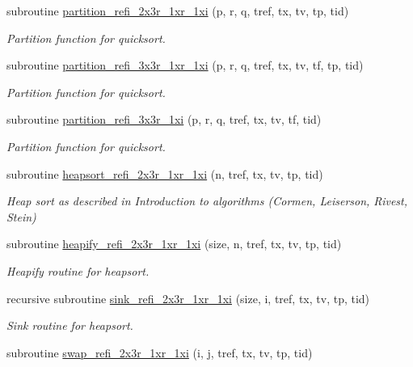 \begin{DoxyCompactItemize}
subroutine \hyperlink{classmodsortinterf_afb245c76ff89ec76fd050a43eabcecd9}{partition\-\_\-refi\-\_\-2x3r\-\_\-1xr\-\_\-1xi} (p, r, q, tref, tx, tv, tp, tid)
\begin{DoxyCompactList}\small\item\em Partition function for quicksort. \end{DoxyCompactList}\item 
subroutine \hyperlink{classmodsortinterf_a1cc99117f29237a3a9a368981a8ccd67}{partition\-\_\-refi\-\_\-3x3r\-\_\-1xr\-\_\-1xi} (p, r, q, tref, tx, tv, tf, tp, tid)
\begin{DoxyCompactList}\small\item\em Partition function for quicksort. \end{DoxyCompactList}\item 
subroutine \hyperlink{classmodsortinterf_ac2c52347c0eec87e2c2e6df84257a6d9}{partition\-\_\-refi\-\_\-3x3r\-\_\-1xi} (p, r, q, tref, tx, tv, tf, tid)
\begin{DoxyCompactList}\small\item\em Partition function for quicksort. \end{DoxyCompactList}\item 
subroutine \hyperlink{classmodsortinterf_ada0c844a63cc8db123d38c60d4d1fb9b}{heapsort\-\_\-refi\-\_\-2x3r\-\_\-1xr\-\_\-1xi} (n, tref, tx, tv, tp, tid)
\begin{DoxyCompactList}\small\item\em Heap sort as described in Introduction to algorithms (Cormen, Leiserson, Rivest, Stein) \end{DoxyCompactList}\item 
subroutine \hyperlink{classmodsortinterf_a6974ca12c9ea8fbdc70d0ebed2112db4}{heapify\-\_\-refi\-\_\-2x3r\-\_\-1xr\-\_\-1xi} (size, n, tref, tx, tv, tp, tid)
\begin{DoxyCompactList}\small\item\em Heapify routine for heapsort. \end{DoxyCompactList}\item 
recursive subroutine \hyperlink{classmodsortinterf_aea41780f5ae8674251a6fae90de5353b}{sink\-\_\-refi\-\_\-2x3r\-\_\-1xr\-\_\-1xi} (size, i, tref, tx, tv, tp, tid)
\begin{DoxyCompactList}\small\item\em Sink routine for heapsort. \end{DoxyCompactList}\item 
subroutine \hyperlink{classmodsortinterf_a20617d2a8ec60ff24fd8c4faa2198bdf}{swap\-\_\-refi\-\_\-2x3r\-\_\-1xr\-\_\-1xi} (i, j, tref, tx, tv, tp, tid)

\end{DoxyCompactItemize}
